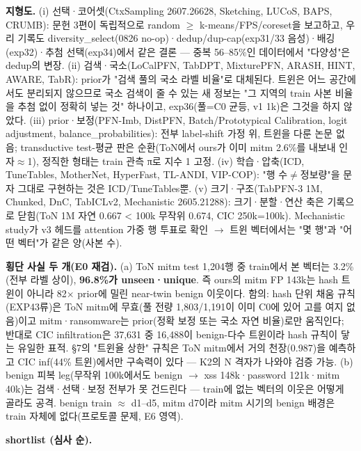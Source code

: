 \textbf{지형도.} (i) 선택·코어셋(CtxSampling 2607.26628, Sketching, LUCoS, BAPS, CRUMB): 문헌 3편이 독립적으로 random \ensuremath{\geq} k-means/\allowbreak{}FPS/\allowbreak{}coreset을 보고하고, 우리 기록도 diversity\_\allowbreak{}select(0826 no-op)·dedup/\allowbreak{}dup-cap(exp31/\allowbreak{}33 음성)·배깅(exp32)·추첨 선택(exp34)에서 같은 결론 — 중복 56–85\%인 데이터에서 "다양성"은 dedup의 변장. (ii) 검색·국소(LoCalPFN, TabDPT, MixturePFN, ARASH, HINT, AWARE, TabR): prior가 "검색 풀의 국소 라벨 비율"로 대체된다. 트윈은 어느 공간에서도 분리되지 않으므로 국소 검색이 줄 수 있는 새 정보는 "그 지역의 train 사본 비율을 추첨 없이 정확히 넣는 것" 하나이고, exp36(풀=\allowbreak{}C0 균등, v1 1k)은 그것을 하지 않았다. (iii) prior·보정(PFN-Imb, DistPFN, Batch/\allowbreak{}Prototypical Calibration, logit adjustment, balance\_\allowbreak{}probabilities): 전부 label-shift 가정 위, 트윈을 다룬 논문 없음; transductive test-평균 판은 순환(ToN에서 ours가 이미 mitm 2.6\%를 내보내 인자\ensuremath{\approx}1), 정직한 형태는 train 관측 π로 지수 1 고정. (iv) 학습·압축(ICD, TuneTables, MotherNet, HyperFast, TL-ANDI, VIP-COP): "행 수\ensuremath{\neq}정보량"을 문자 그대로 구현하는 것은 ICD/\allowbreak{}TuneTables뿐. (v) 크기·구조(TabPFN-3 1M, Chunked, DnC, TabICLv2, Mechanistic 2605.21288): 크기·분할·연산 축은 기록으로 닫힘(ToN 1M 자연 0.667 < 100k 무작위 0.674, CIC 250k=\allowbreak{}100k). Mechanistic study가 v3 헤드를 attention 가중 행 투표로 확인  \ensuremath{\rightarrow}  트윈 벡터에서는 "몇 행"과 "어떤 벡터"가 같은 양(사본 수).

\textbf{횡단 사실 두 개(E0 재검).} (a) ToN mitm test 1,204행 중 train에서 본 벡터는 3.2\%(전부 라벨 상이), \textbf{96.8\%가 unseen·unique}. 즉 ours의 mitm FP 143k는 hash 트윈이 아니라 82× prior에 밀린 near-twin benign 이웃이다. 함의: hash 단위 채움 규칙(EXP43류)은 ToN mitm에 무효(풀 전량 1,803/\allowbreak{}1,191이 이미 C0에 있어 고를 여지 없음)이고 mitm·ransomware는 prior(정확 보정 또는 국소 자연 비율)로만 움직인다; 반대로 CIC infiltration은 37,631 중 16,488이 benign-다수 트윈이라 hash 규칙이 닿는 유일한 표적. §7의 "트윈율 상한" 규칙은 ToN mitm에서 거의 천장(0.987)을 예측하고 CIC inf(44\% 트윈)에서만 구속력이 있다 — K2의 N 격자가 나와야 검증 가능. (b) benign 피복 leg(무작위 100k에서도 benign \ensuremath{\rightarrow} xss 148k·password 121k·mitm 40k)는 검색·선택·보정 전부가 못 건드린다 — train에 없는 벡터의 이웃은 어떻게 골라도 공격. benign train \ensuremath{\approx} d1–d5, mitm d7이라 mitm 시기의 benign 배경은 train 자체에 없다(프로토콜 문제, E6 영역).

\textbf{shortlist (심사 순).}

